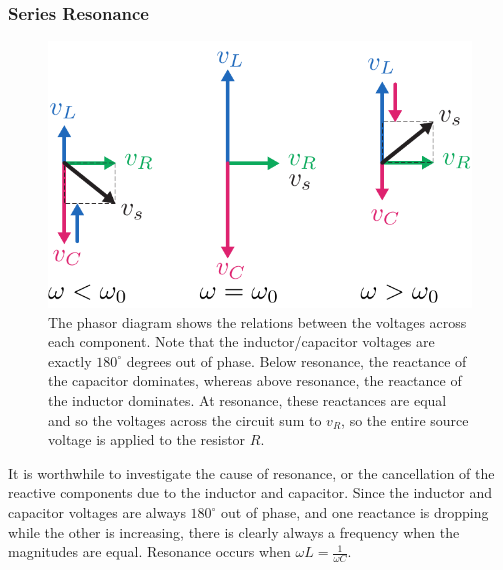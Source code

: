 \subsubsection{Series Resonance}
\begin{figure}
\begin{center}
\includegraphics[scale=.8]{rlcphasor}
\end{center}
\caption{The phasor diagram shows the relations between the voltages across each component.  Note that the inductor/capacitor voltages are exactly $180^\circ$ degrees out of phase.  Below resonance, the reactance of the capacitor dominates, whereas above resonance, the reactance of the inductor dominates.  At resonance, these reactances are equal and so the voltages across the circuit sum to $v_R$, so the entire source voltage is applied to the resistor $R$. }
\label{fig:rlcphasor}
\end{figure}
It is worthwhile to investigate the cause of resonance, or the cancellation of the reactive components due to the inductor and capacitor.  Since the inductor and capacitor voltages are always $180^\circ$ out of phase, and one reactance is dropping while the other is increasing, there is clearly always a frequency when the magnitudes are equal.  Resonance occurs when $\omega L = \frac{1}{\omega C}$.  
